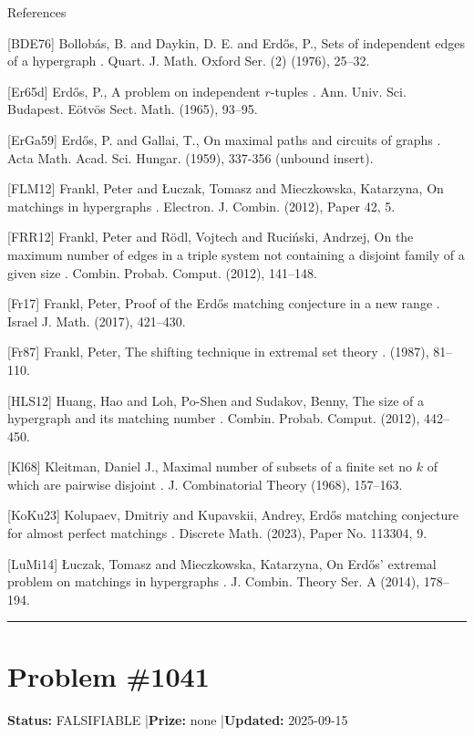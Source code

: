 \documentclass{article}
\begin{document}
References

[BDE76] Bollob\'{a}s, B. and Daykin, D. E. and Erd\H{o}s, P., Sets of independent edges of a hypergraph . Quart. J. Math. Oxford Ser. (2) (1976), 25--32.

[Er65d] Erd\H{o}s, P., A problem on independent {$r$}-tuples . Ann. Univ. Sci. Budapest. E\"otv\"os Sect. Math. (1965), 93--95.

[ErGa59] Erd\H{o}s, P. and Gallai, T., On maximal paths and circuits of graphs . Acta Math. Acad. Sci. Hungar. (1959), 337-356 (unbound insert).

[FLM12] Frankl, Peter and \L uczak, Tomasz and Mieczkowska, Katarzyna, On matchings in hypergraphs . Electron. J. Combin. (2012), Paper 42, 5.

[FRR12] Frankl, Peter and R\"odl, Vojtech and Ruci\'nski, Andrzej, On the maximum number of edges in a triple system not containing a disjoint family of a given size . Combin. Probab. Comput. (2012), 141--148.

[Fr17] Frankl, Peter, Proof of the {E}rd\H{o}s matching conjecture in a new range . Israel J. Math. (2017), 421--430.

[Fr87] Frankl, Peter, The shifting technique in extremal set theory . (1987), 81--110.

[HLS12] Huang, Hao and Loh, Po-Shen and Sudakov, Benny, The size of a hypergraph and its matching number . Combin. Probab. Comput. (2012), 442--450.

[Kl68] Kleitman, Daniel J., Maximal number of subsets of a finite set no {$k$} of which are pairwise disjoint . J. Combinatorial Theory (1968), 157--163.

[KoKu23] Kolupaev, Dmitriy and Kupavskii, Andrey, Erd\H{o}s matching conjecture for almost perfect matchings . Discrete Math. (2023), Paper No. 113304, 9.

[LuMi14] \L uczak, Tomasz and Mieczkowska, Katarzyna, On {E}rd\H{o}s' extremal problem on matchings in hypergraphs . J. Combin. Theory Ser. A (2014), 178--194.

\noindent\rule{\linewidth}{0.4pt}


\section{Problem \#1041}
\label{prob:1041}

\noindent\textbf{Status:} FALSIFIABLE \quad|\quad \textbf{Prize:} none \quad|\quad \textbf{Updated:} 2025-09-15
\end{document}
